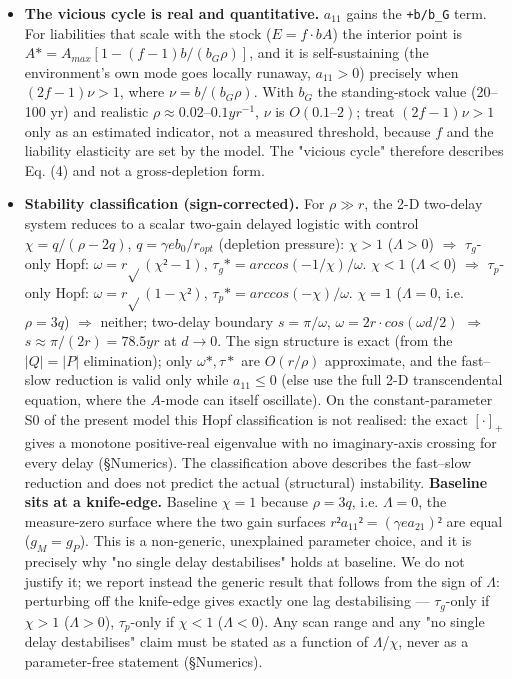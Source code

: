 \documentclass[11pt]{article}
\begin{document}
\begin{itemize}
\item \textbf{The vicious cycle is real and quantitative.} $a_{11}$ gains the \texttt{+b/b\_G} term. For liabilities that scale with the stock ($E = f\cdot{}bA$) the interior point is $A* = A_{max}[1 - (f-1)b/(b_{G} \rho{})]$, and it is self-sustaining (the environment's own mode goes locally runaway, $a_{11} > 0$) precisely when $(2f-1)\nu{} > 1$, where $\nu{} = b/(b_{G} \rho{})$. With $b_{G}$ the standing-stock value (20–100 yr) and realistic $\rho{} \approx{} 0.02–0.1 yr^{-1}$, $\nu{}$ is $O(0.1–2)$; treat $(2f-1)\nu{} > 1$ only as an estimated indicator, not a measured threshold, because $f$ and the liability elasticity are set by the model. The "vicious cycle" therefore describes Eq. (4) and not a gross-depletion form.
\item \textbf{Stability classification (sign-corrected).} For $\rho{} \gg{} r$, the 2-D two-delay system reduces to a scalar two-gain delayed logistic with control $\chi{} = q/(\rho{} - 2q)$, $q = \gamma{} e b_{0}/r_{opt}$ (depletion pressure): $\chi{} > 1$ ($\Lambda{} > 0$) \ensuremath{\Rightarrow{}} $\tau{}_{g}$-only Hopf: $\omega{} = r\sqrt{}(\chi{}²-1)$, $\tau{}_{g}* = arccos(-1/\chi{})/\omega{}$. $\chi{} < 1$ ($\Lambda{} < 0$) \ensuremath{\Rightarrow{}} $\tau{}_{p}$-only Hopf: $\omega{} = r\sqrt{}(1-\chi{}²)$, $\tau{}_{p}* = arccos(-\chi{})/\omega{}$. $\chi{} = 1$ ($\Lambda{} = 0$, i.e. $\rho{} = 3q$) \ensuremath{\Rightarrow{}} neither; two-delay boundary $s = \pi{}/\omega{}$, $\omega{} = 2r\cdot{}cos(\omega{}d/2)$ \ensuremath{\Rightarrow{}} $s \approx{} \pi{}/(2r) = 78.5 yr$ at $d \to{} 0$. The sign structure is exact (from the $|Q| = |P|$ elimination); only $\omega{}*, \tau{}*$ are $O(r/\rho{})$ approximate, and the fast–slow reduction is valid only while $a_{11} \leq{} 0$ (else use the full 2-D transcendental equation, where the $A$-mode can itself oscillate). On the constant-parameter S0 of the present model this Hopf classification is not realised: the exact $[\cdot{}]_{+}$ gives a monotone positive-real eigenvalue with no imaginary-axis crossing for every delay (§Numerics). The classification above describes the fast–slow reduction and does not predict the actual (structural) instability. \textbf{Baseline sits at a knife-edge.} Baseline $\chi{} = 1$ because $\rho{} = 3q$, i.e. $\Lambda{} = 0$, the measure-zero surface where the two gain surfaces $r²a_{11}² = (\gamma{} e a_{21})²$ are equal ($g_{M} = g_{P}$). This is a non-generic, unexplained parameter choice, and it is precisely why "no single delay destabilises" holds at baseline. We do not justify it; we report instead the generic result that follows from the sign of $\Lambda{}$: perturbing off the knife-edge gives exactly one lag destabilising — $\tau{}_{g}$-only if $\chi{} > 1$ ($\Lambda{} > 0$), $\tau{}_{p}$-only if $\chi{} < 1$ ($\Lambda{} < 0$). Any scan range and any "no single delay destabilises" claim must be stated as a function of $\Lambda{}$/$\chi{}$, never as a parameter-free statement (§Numerics).
\end{itemize}
\end{document}
